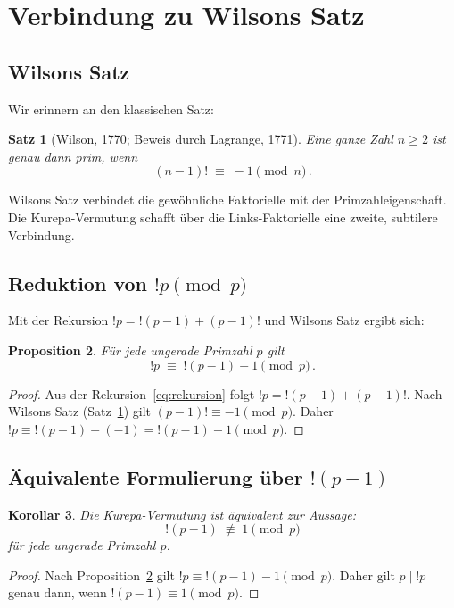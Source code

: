 \documentclass[12pt,a4paper]{amsart}
\newtheorem{theorem}{Satz}[section]
\newtheorem{korollar}[theorem]{Korollar}
\newtheorem{proposition}[theorem]{Proposition}
\theoremstyle{definition}
\begin{document}
\section{Verbindung zu Wilsons Satz}
\label{sec:wilson}

\subsection{Wilsons Satz}

Wir erinnern an den klassischen Satz:

\begin{theorem}[Wilson, 1770; Beweis durch Lagrange, 1771]\label{satz:wilson}
Eine ganze Zahl $n \geq 2$ ist genau dann prim, wenn
\[
  (n-1)! \;\equiv\; -1 \pmod{n}\,.
\]
\end{theorem}

Wilsons Satz verbindet die gewöhnliche Faktori\-elle mit der Primzahleigenschaft.
Die Kurepa-Vermutung schafft über die Links-Faktori\-elle eine zweite,
subtilere Verbindung.

\subsection{Reduktion von $!p \pmod{p}$}

Mit der Rekursion $!p = !(p-1) + (p-1)!$ und Wilsons Satz ergibt sich:

\begin{proposition}\label{prop:wilson-reduktion}
Für jede ungerade Primzahl $p$ gilt
\[
  !p \;\equiv\; !(p-1) - 1 \pmod{p}\,.
\]
\end{proposition}
\begin{proof}
Aus der Rekursion~\eqref{eq:rekursion} folgt
$!p = !(p-1) + (p-1)!$.
Nach Wilsons Satz (Satz~\ref{satz:wilson}) gilt
$(p-1)! \equiv -1 \pmod{p}$.
Daher $!p \equiv !(p-1) + (-1) = !(p-1) - 1 \pmod{p}$.
\end{proof}

\subsection{Äquivalente Formulierung über $!(p-1)$}

\begin{korollar}\label{kor:aequiv}
Die Kurepa-Vermutung ist äquivalent zur Aussage:
\[
  !(p-1) \;\not\equiv\; 1 \pmod{p}
\]
für jede ungerade Primzahl $p$.
\end{korollar}
\begin{proof}
Nach Proposition~\ref{prop:wilson-reduktion} gilt
$!p \equiv !(p-1) - 1 \pmod{p}$.
Daher gilt $p \mid !p$ genau dann, wenn $!(p-1) \equiv 1 \pmod{p}$.
\end{proof}
\end{document}
